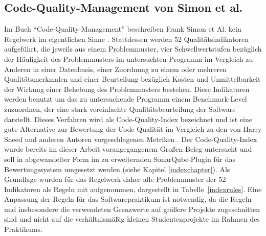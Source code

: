 \documentclass[da,ngerman]{stthesis}
\begin{document}
			\subsection{Code-Quality-Management von Simon et al.} \label{cqirules}
				Im Buch "`Code-Quality-Management"' beschreiben Frank Simon et Al. kein Regelwerk im eigentlichen Sinne \cite{CodeQualityManagement}. Stattdessen werden 52 Qualitätsindikatoren aufgeführt, die jeweils aus einem Problemmuster, vier Schwellwertstufen bezüglich der Häufigkeit des Problemmusters im untersuchten Programm im Vergleich zu Anderen in einer Datenbasis, einer Zuordnung zu einem oder mehreren Qualitätsmerkmalen und einer Beurteilung bezüglich Kosten und Unmittelbarkeit der Wirkung einer Behebung des Problemmusters bestehen. Diese Indikatoren werden benutzt um das zu untersuchende Programm einem Benchmark-Level zuzuordnen, der eine stark vereinfachte Qualitätsbeurteilung der Software darstellt. Dieses Verfahren wird als Code-Quality-Index bezeichnet und ist eine gute Alternative zur Bewertung der Code-Qualität im Vergleich zu den von Harry Sneed und anderen Autoren vorgeschlagenen Metriken \cite{SoftwareInZahlen}. \newline
				Der Code-Quality-Index wurde bereits im dieser Arbeit vorangegangenem Großen Beleg untersucht \cite{grosserBeleg} und soll in abgewandelter Form im zu erweiternden SonarQube-Plugin für das Bewertungssystem umgesetzt werden (siehe Kapitel \ref{indexchapter}). Als Grundlage wurden für das Regelwerk daher alle Problemmuster der 52 Indikatoren als Regeln mit aufgenommen, dargestellt in Tabelle~\ref{indexrules}. Eine Anpassung der Regeln für das Softwarepraktikum ist notwendig, da die Regeln und insbesondere die verwendeten Grenzwerte auf größere Projekte zugeschnitten sind und nicht auf die verhältnismäßig kleinen Studentenprojekte im Rahmen des Praktikums. 
\end{document}
